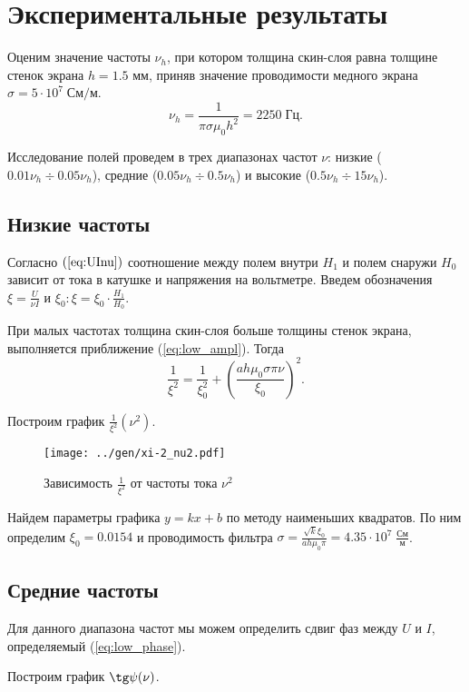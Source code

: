 \section*{Экспериментальные результаты}

Оценим значение частоты $\nu_h$, при котором толщина скин-слоя равна толщине стенок экрана $h = 1.5$ мм, приняв значение проводимости медного экрана $\sigma = 5 \cdot 10^7 \; \text{См}/\text{м}$.
$$ \nu_h = \frac{1}{\pi \sigma \mu_0 h^2} = 2250 \; \text{Гц}. $$ 

Исследование полей проведем в трех диапазонах частот $\nu$: низкие ($0.01 \nu_h \div 0.05 \nu_h$), средние ($0.05 \nu_h \div 0.5 \nu_h$) и высокие ($0.5 \nu_h \div 15 \nu_h$).

\subsection*{Низкие частоты}

Согласно $(\ref{eq:UInu})$ соотношение между полем внутри $H_1$ и полем снаружи $H_0$ зависит от тока в катушке и напряжения на вольтметре. Введем обозначения $\xi = \frac{U}{\nu I}$ и $\xi_0: \xi = \xi_0 \cdot \frac{H_1}{H_0}$. 

При малых частотах толщина скин-слоя больше толщины стенок экрана, выполняется приближение (\ref{eq:low_ampl}). Тогда
$$\frac{1}{\xi^2} = \frac{1}{\xi_0^2} + \left(\frac{ah\mu_0 \sigma \pi \nu}{\xi_0}\right)^2.$$

Построим график $\frac{1}{\xi^2}(\nu^2)$.

\begin{figure}[H]
	\centering
	\texttt{[image: ../gen/xi-2\_nu2.pdf]}
	\caption{Зависимость $\frac{1}{\xi^2}$ от частоты тока $\nu^2$}
	\label{fig:xi-2_nu2}
\end{figure}

Найдем параметры графика $y = kx + b$ по методу наименьших квадратов. По ним определим $\xi_0 = 0.0154$ и проводимость фильтра $\sigma = \frac{\sqrt{k} \xi_0}{a h \mu_0 \pi} = 4.35 \cdot 10^7 \; \frac{\text{См}}{\text{м}}$.

\subsection*{Средние частоты}

Для данного диапазона частот мы можем определить сдвиг фаз между $U$ и $I$, определяемый (\ref{eq:low_phase}). 

Построим график $\tg \psi (\nu)$.

